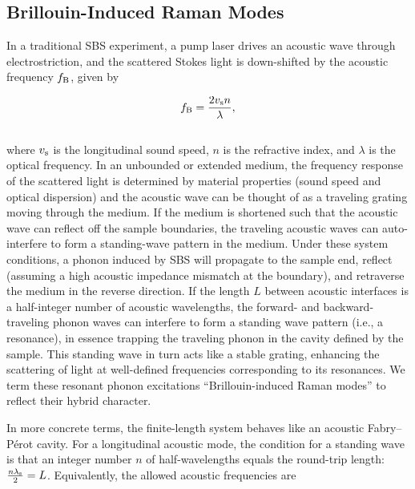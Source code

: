 \subsection{Brillouin-Induced Raman Modes}
\label{subsec:Raman:Brillouin-InducedRamanModes}

In a traditional SBS experiment, a pump laser drives an acoustic wave through electrostriction, and the scattered Stokes light is down-shifted by the acoustic frequency \(f_{\rm B}\), given by \cite{boyd2020nonlinear}

\begin{equation}
  f_{\rm B} = \frac{2v_{\rm s}n}{\lambda},
  \label{eq:Raman:f_B}
\end{equation}
\\
where \(v_{\rm s}\) is the longitudinal sound speed, \(n\) is the refractive index, and \(\lambda\) is the optical frequency. In an unbounded or extended medium, the frequency response of the scattered light is determined by material properties (sound speed and optical dispersion) and the acoustic wave can be thought of as a traveling grating moving through the medium. If the medium is shortened such that the acoustic wave can reflect off the sample boundaries, the traveling acoustic waves can auto-interfere to form a standing-wave pattern in the medium. Under these system conditions, a phonon induced by \ac{SBS} will propagate to the sample end, reflect (assuming a high acoustic impedance mismatch at the boundary), and retraverse the medium in the reverse direction. If the length \(L\) between acoustic interfaces is a half-integer number of acoustic wavelengths, the forward- and backward-traveling phonon waves can interfere to form a standing wave pattern (i.e., a resonance), in essence trapping the traveling phonon in the cavity defined by the sample. This standing wave in turn acts like a stable grating, enhancing the scattering of light at well-defined frequencies corresponding to its resonances. We term these resonant phonon excitations ``Brillouin-induced Raman modes'' to reflect their hybrid character.

In more concrete terms, the finite-length system behaves like an acoustic Fabry–Pérot cavity. For a longitudinal acoustic mode, the condition for a standing wave is that an integer number \(n\) of half-wavelengths equals the round-trip length: \(\frac {n\lambda_{\rm s}}{2} = L\). Equivalently, the allowed acoustic frequencies are

